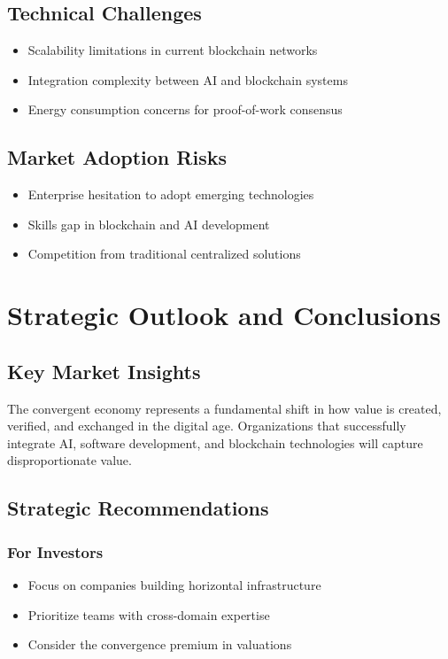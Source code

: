 \documentclass[11pt,a4paper]{report}
\begin{document}
\section{Technical Challenges}

\begin{itemize}
\item Scalability limitations in current blockchain networks
\item Integration complexity between AI and blockchain systems
\item Energy consumption concerns for proof-of-work consensus
\end{itemize}

\section{Market Adoption Risks}

\begin{itemize}
\item Enterprise hesitation to adopt emerging technologies
\item Skills gap in blockchain and AI development
\item Competition from traditional centralized solutions
\end{itemize}

\chapter{Strategic Outlook and Conclusions}

\section{Key Market Insights}

The convergent economy represents a fundamental shift in how value is created, verified, and exchanged in the digital age. Organizations that successfully integrate AI, software development, and blockchain technologies will capture disproportionate value.

\section{Strategic Recommendations}

\subsection{For Investors}
\begin{itemize}
\item Focus on companies building horizontal infrastructure
\item Prioritize teams with cross-domain expertise
\item Consider the convergence premium in valuations
\end{itemize}
\end{document}
